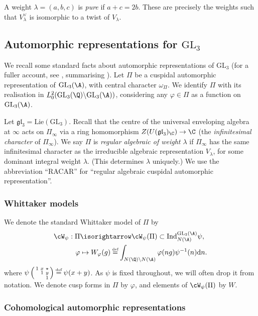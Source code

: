 \documentclass[10pt,reqno,a4paper]{amsart}
\newcommand{\GL}{\mathrm{GL}}
\newcommand{\smallthreemat}[9]{\left(\begin{smallmatrix}
#1 & #2 & #3 \\
#4 & #5 & #6 \\
#7 & #8 & #9\end{smallmatrix}\right)}
\begin{document}
A weight $\lambda = (a,b,c)$ is \emph{pure} if $a + c = 2b$. These are precisely the weights such that $V_{\lambda}^\vee$ is isomorphic to a twist of $V_{\lambda}$.

\subsection{Automorphic representations for \texorpdfstring{$\GL_3$}{GL3}}

We recall some standard facts about automorphic representations of $\GL_3$ (for a fuller account, see \cite[\S3.1]{Mah05}, summarising \cite[\S3]{Clo90}). Let $\Pi$ be a cuspidal automorphic representation of $\GL_3(\A)$, with central character $\omega_{\Pi}$. We identify $\Pi$ with its realisation in $L^2_0(\GL_3(\Q)\backslash \GL_3(\A))$, considering any $\varphi \in \Pi$ as a function on $\GL_3(\A)$.


Let $\mathfrak{gl}_3 = \mathrm{Lie}(\GL_3)$. Recall that the centre of the universal enveloping algebra at $\infty$ acts on $\Pi_\infty$ via a ring homomorphism $Z(U(\mathfrak{gl}_3)_{\C}) \to \C$ (the \emph{infinitesimal character} of $\Pi_\infty$). We say $\Pi$ is \emph{regular algebraic of weight $\lambda$} if $\Pi_\infty$ has the same infinitesimal character as the irreducible algebraic representation $V_\lambda$, for some dominant integral weight $\lambda$. (This determines $\lambda$ uniquely.) We use the abbreviation ``RACAR'' for ``regular algebraic cuspidal automorphic representation''.

\subsubsection{Whittaker models}\label{sec:whittaker}
We denote the standard Whittaker model of $\Pi$ by
\begin{align*}
\cW_\psi : \Pi &\isorightarrow \cW_\psi(\Pi) \subset \mathrm{Ind}_{N(\A)}^{\GL_3(\A)}\psi,\\
\varphi &\mapsto W_\varphi(g) \defeq \int_{N(\Q)\backslash N(\A)}\varphi(ng)\psi^{-1}(n) \mathrm{d}n.
\end{align*}
where $\psi\smallthreemat{1}{x}{\star}{}{1}{y}{}{}{1} \defeq \psi(x+y)$. As $\psi$ is fixed throughout, we will often drop it from notation. We denote cusp forms in $\Pi$ by $\varphi$, and elements of $\cW_\psi(\Pi)$ by $W$.

\subsubsection{Cohomological automorphic representations}\label{sec:cohomological}
\end{document}
